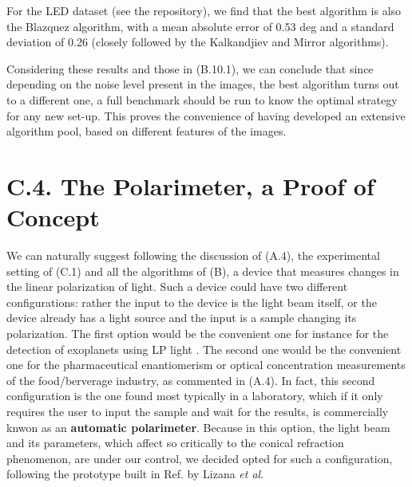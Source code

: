 \documentclass[11pt, a4paper, twoside]{article} %
\begin{document}
For the LED dataset (see the repository), we find that the best algorithm is also the Blazquez algorithm, with a mean absolute error of 0.53 deg and a standard deviation of 0.26 (closely followed by the Kalkandjiev and Mirror algorithms).\vspace{-0.06cm}

Considering these results and those in (B.10.1), we can conclude that since depending on the noise level present in the images, the best algorithm turns out to a different one, a full benchmark should be run to know the optimal strategy for any new set-up. This proves the convenience of having developed an extensive algorithm pool, based on different features of the images.\vspace{-0.4cm}

\section*{C.4. The Polarimeter, a Proof of Concept\vspace{-0.2cm}} 
We can naturally suggest following the discussion of (A.4), the experimental setting of (C.1) and all the algorithms of (B), a device that measures changes in the linear polarization of light. Such a device could have two different configurations: rather the input to the device is the light beam itself, or the device already has a light source and the input is a sample changing its polarization. The first option would be the convenient one for instance for the detection of exoplanets using LP light \cite{exoplanets, exoplanets2}. The second one would be the convenient one for the pharmaceutical enantiomerism or optical concentration measurements of the food/berverage industry, as commented in (A.4). In fact, this second configuration is the one found most typically in a laboratory, which if it only requires the user to input the sample and wait for the results, is commercially knwon as an {\bf automatic polarimeter}. Because in this option, the light beam and its parameters, which affect so critically to the conical refraction phenomenon, are under our control, we decided opted for such a configuration, following the prototype built in Ref. \cite{incomplete} by Lizana {\em et al}.
\end{document}
